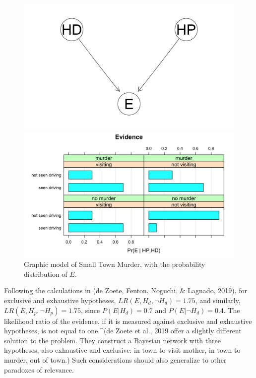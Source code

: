 \documentclass[10pt,dvipsnames,enabledeprecatedfontcommands]{scrartcl}
\begin{document}
\begin{figure}[h]
\begin{minipage}{0.4\textwidth}
\includegraphics{STMdag.png}
\end{minipage} \hfill \begin{minipage}{0.4\textwidth}
\includegraphics{STMpt.png}
\end{minipage}
\caption{Graphic model of Small Town Murder, with the  probability distribution of $E$.}
\label{fig:bayes_test4}
\end{figure}

\noindent
 Following the calculations in (de Zoete, Fenton, Noguchi, \& Lagnado,
2019), for exclusive and exhaustive hypotheses,
\(LR(E,H_d,\neg H_d)=1.75\), and similarly,
\(LR(E,H_p, \neg H_p)=1.75\), since \(P(E\vert H_d)=0.7\) and
\(P(E\vert \neg H_d)=0.4\). The likelihood ratio of the evidence, if it
is measured against exclusive and exhaustive hypotheses, is not equal to
one.\^{}(de Zoete et al., 2019 offer a slightly different solution to
the problem. They construct a Bayesian network with three hypotheses,
also exhaustive and exclusive: in town to visit mother, in town to
murder, out of town.) Such considerations should also generalize to
other paradoxes of relevance.
\end{document}
